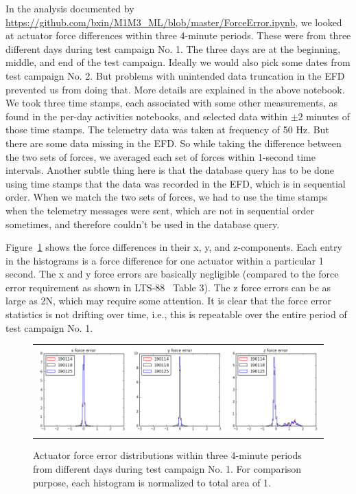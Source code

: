 \documentclass [twoside,openbib,12pt]{article}
\begin{document}
In the analysis documented by
\url{https://github.com/bxin/M1M3_ML/blob/master/ForceError.ipynb},
we looked at actuator force differences within three 4-minute
periods. These were from three different days during test campaign
No. 1.
The three days are at the beginning, middle, and end of the test
campaign.
Ideally we would also pick some dates from test campaign No. 2. But
problems with unintended data truncation in the EFD prevented us from
doing that. More details are explained in the above notebook.
We took three time stamps, each associated with some other
measurements, as found in the per-day activities notebooks, and
selected data within $\pm$2 minutes of those time stamps.
The telemetry data was taken at frequency of 50 Hz. But there are some
data missing in the EFD. So while taking the difference between the
two sets of forces, we averaged each set of forces within 1-second time intervals.
Another subtle thing here is that the database query has to be done
using time stamps that the data was recorded in the EFD, which is in
sequential order. When we match the two sets of forces, we had to use
the time stamps when the telemetry messages were sent, which are not
in sequential order sometimes, and therefore couldn't be used in the
database query.

Figure~\ref{fig:forceError} shows the force differences in their x, y,
and z-components. Each entry in the histograms is a force difference
for one actuator within a particular 1 second.
The x and y force errors are basically negligible (compared to the
force error requirement as shown in LTS-88~\cite{lts88} Table 3).
The z force errors can be as large as 2N, which may require some attention.
It is clear that the force error statistics is not drifting over time, i.e.,
this is repeatable over the entire period of test campaign No. 1.

 \begin{figure}[bthp]
   \begin{center}
     \begin{tabular}{c}
\includegraphics[width=170mm]{figures/forceError.png}
  \end{tabular}
   \end{center}
   \caption
   { \label{fig:forceError}
Actuator force error distributions within three 4-minute periods from
different days during test campaign No. 1. For comparison purpose, each histogram is
normalized to total area of 1.
 }
\end{figure}
\end{document}
